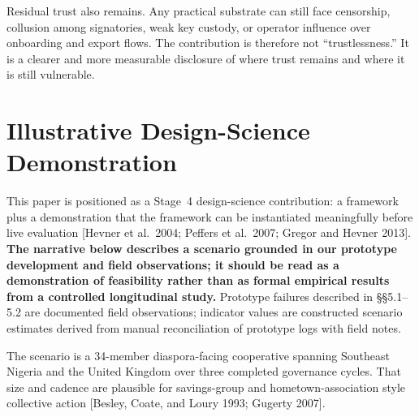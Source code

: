 \documentclass[sigconf,anonymous]{acmart}
\begin{document}
Residual trust also remains. Any practical substrate can still face censorship, collusion among signatories, weak key custody, or operator influence over onboarding and export flows. The contribution is therefore not ``trustlessness.'' It is a clearer and more measurable disclosure of where trust remains and where it is still vulnerable.

\section{Illustrative Design-Science Demonstration}

This paper is positioned as a Stage~4 design-science contribution: a framework plus a demonstration that the framework can be instantiated meaningfully before live evaluation [Hevner et al.\ 2004; Peffers et al.\ 2007; Gregor and Hevner 2013]. \textbf{The narrative below describes a scenario grounded in our prototype development and field observations; it should be read as a demonstration of feasibility rather than as formal empirical results from a controlled longitudinal study.} Prototype failures described in \S\S5.1--5.2 are documented field observations; indicator values are constructed scenario estimates derived from manual reconciliation of prototype logs with field notes.

The scenario is a 34-member diaspora-facing cooperative spanning Southeast Nigeria and the United Kingdom over three completed governance cycles. That size and cadence are plausible for savings-group and hometown-association style collective action [Besley, Coate, and Loury 1993; Gugerty 2007].
\end{document}
